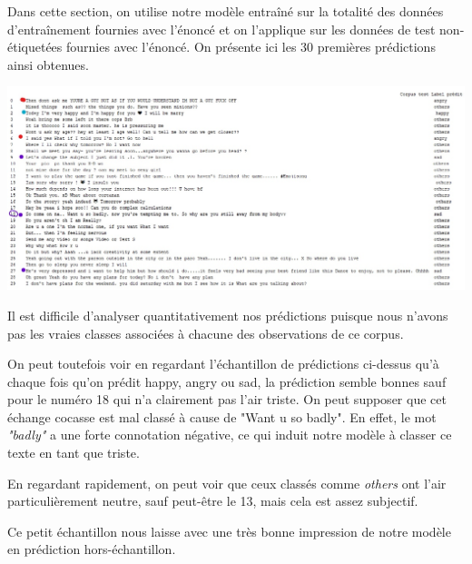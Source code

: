 Dans cette section, on utilise notre modèle entraîné sur la totalité des données d'entraînement fournies avec l'énoncé et on l'applique sur les données de test non-étiquetées fournies avec l'énoncé. On présente ici les 30 premières prédictions ainsi obtenues.

\includegraphics[width=\linewidth,keepaspectratio]{images/couleur_predictions}

Il est difficile d'analyser quantitativement nos prédictions puisque nous n'avons pas les vraies classes associées à chacune des observations de ce corpus.

On peut toutefois voir en regardant l'échantillon de prédictions ci-dessus qu'à chaque fois qu'on prédit happy, angry ou sad, la prédiction semble bonnes sauf pour le numéro 18 qui n'a clairement pas l'air triste. On peut supposer que cet échange cocasse est mal classé à cause de "Want u so badly". En effet, le mot \emph{"badly"} a une forte connotation négative, ce qui induit notre modèle à classer ce texte en tant que triste.

En regardant rapidement, on peut voir que ceux classés comme \emph{others} ont l'air particulièrement neutre, sauf peut-être le 13, mais cela est assez subjectif.

Ce petit échantillon nous laisse avec une très bonne impression de notre modèle en prédiction hors-échantillon.